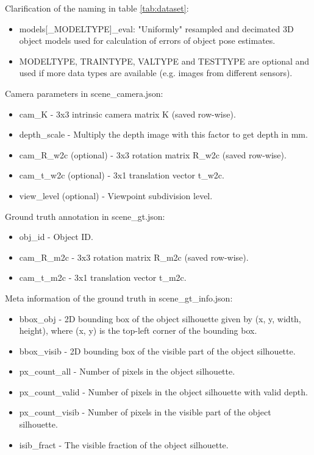 \documentclass[12pt,DIV14,BCOR12mm,a4paper,footinclude=false,headinclude,parskip=half-,twoside,openright,cleardoublepage=empty,toc=index,bibliography=totoc,listof=totoc]{scrreprt}
\numberwithin{equation}{chapter}
\begin{document}
Clarification of the naming in table \ref{tab:dataset}:
\begin{itemize}
  \item models[\_MODELTYPE]\_eval: "Uniformly" resampled and decimated 3D object models used for calculation of errors of object pose estimates.
  \item MODELTYPE, TRAINTYPE, VALTYPE and TESTTYPE are optional and used if more data types are available (e.g. images from different sensors).
\end{itemize}
Camera parameters in scene\_camera.json:
\begin{itemize}
  \item cam\_K - 3x3 intrinsic camera matrix K (saved row-wise).
  \item depth\_scale - Multiply the depth image with this factor to get depth in mm.
  \item cam\_R\_w2c (optional) - 3x3 rotation matrix R\_w2c (saved row-wise).
  \item cam\_t\_w2c (optional) - 3x1 translation vector t\_w2c.
  \item view\_level (optional) - Viewpoint subdivision level.
\end{itemize}
Ground truth annotation in scene\_gt.json:
\begin{itemize}
  \item obj\_id - Object ID.
  \item cam\_R\_m2c - 3x3 rotation matrix R\_m2c (saved row-wise).
  \item cam\_t\_m2c - 3x1 translation vector t\_m2c.
\end{itemize}
Meta information of the ground truth in scene\_gt\_info.json:
\begin{itemize}
  \item bbox\_obj - 2D bounding box of the object silhouette given by (x, y, width, height), where (x, y) is the top-left corner of the bounding box.
  \item bbox\_visib - 2D bounding box of the visible part of the object silhouette.
  \item px\_count\_all - Number of pixels in the object silhouette.
  \item px\_count\_valid - Number of pixels in the object silhouette with valid depth.
  \item px\_count\_visib - Number of pixels in the visible part of the object silhouette.
  \item isib\_fract - The visible fraction of the object silhouette.
\end{itemize}
\end{document}
